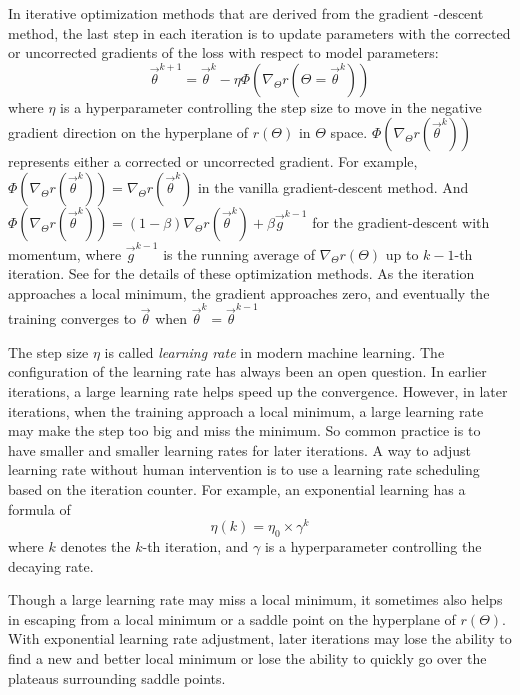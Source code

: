In iterative optimization methods that are derived from the gradient -descent method, the last step in each iteration is to update parameters with the corrected or uncorrected gradients of the loss with respect to model parameters:
\begin{equation}
    \vec{\theta}^{k+1} = \vec{\theta}^{k} - \eta\Phi(\nabla_{\Theta}r(\Theta=\vec{\theta}^k))
\end{equation}
where $\eta$ is a hyperparameter controlling the step size to move in the negative gradient direction on the hyperplane of $r(\Theta)$ in $\Theta$ space.
$\Phi(\nabla_{\Theta}r(\vec{\theta}^k))$ represents either a corrected or uncorrected gradient.
For example, $\Phi(\nabla_{\Theta}r(\vec{\theta}^k))=\nabla_{\Theta}r(\vec{\theta}^k)$ in the vanilla gradient-descent method.
And $\Phi(\nabla_{\Theta}r(\vec{\theta}^k)) = \left(1-\beta\right)\nabla_{\Theta}r(\vec{\theta}^k) + \beta \vec{g}^{k-1}$ for the gradient-descent with momentum, where $\vec{g}^{k-1}$ is the running average of $\nabla_{\Theta}r(\Theta)$ up to $k-1$-th iteration.
See \cite[Section~8.3]{goodfellow_deep_2016} for the details of these optimization methods.
As the iteration approaches a local minimum, the gradient approaches zero, and eventually the training converges to $\vec{\theta}$ when $\vec{\theta}^k=\vec{\theta}^{k-1}$

The step size $\eta$ is called {\it learning rate} in modern machine learning.
The configuration of the learning rate has always been an open question.
In earlier iterations, a large learning rate helps speed up the convergence.
However, in later iterations, when the training approach a local minimum, a large learning rate may make the step too big and miss the minimum.
So common practice is to have smaller and smaller learning rates for later iterations.
A way to adjust learning rate without human intervention is to use a learning rate scheduling based on the iteration counter.
For example, an exponential learning has a formula of
\begin{equation}
    \eta(k) = \eta_0 \times \gamma^k
\end{equation}
where $k$ denotes the $k$-th iteration, and $\gamma$ is a hyperparameter controlling the decaying rate.

Though a large learning rate may miss a local minimum, it sometimes also helps in escaping from a local minimum or a saddle point on the hyperplane of $r(\Theta)$.
With exponential learning rate adjustment, later iterations may lose the ability to find a new and better local minimum or lose the ability to quickly go over the plateaus surrounding saddle points.

